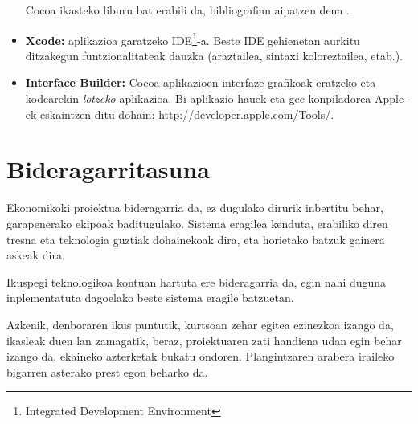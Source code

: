 \begin{itemize}
Cocoa ikasteko liburu bat erabili da, bibliografian aipatzen dena \cite{hi:08}.
\item \textbf{Xcode:} aplikazioa garatzeko IDE\footnote{Integrated Development Environment}-a. Beste IDE gehienetan aurkitu ditzakegun funtzionalitateak dauzka (araztailea, sintaxi koloreztailea, etab.).
\item \textbf{Interface Builder:} Cocoa aplikazioen interfaze grafikoak eratzeko eta kodearekin \textit{lotzeko} aplikazioa. Bi aplikazio hauek eta gcc konpiladorea Apple-ek eskaintzen ditu dohain: \url{http://developer.apple.com/Tools/}.
\end{itemize} 
\section{Bideragarritasuna}
Ekonomikoki proiektua bideragarria da, ez dugulako dirurik inbertitu behar, garapenerako ekipoak baditugulako. Sistema eragilea kenduta, erabiliko diren tresna eta teknologia guztiak dohainekoak dira, eta horietako batzuk gainera askeak dira.

Ikuspegi teknologikoa kontuan hartuta ere bideragarria da, egin nahi duguna inplementatuta dagoelako beste sistema eragile batzuetan.

Azkenik, denboraren ikus puntutik, kurtsoan zehar egitea ezinezkoa izango da, ikasleak duen lan zamagatik, beraz, proiektuaren zati handiena udan egin behar izango da, ekaineko azterketak bukatu ondoren. Plangintzaren arabera iraileko bigarren asterako prest egon beharko da.
